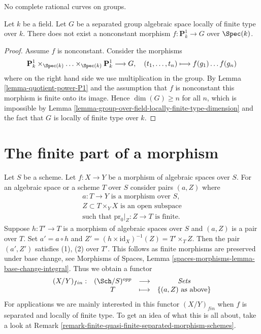\begin{lemma}
\label{lemma-no-nonconstant-morphism-from-P1-to-group}
\begin{slogan}
No complete rational curves on groups.
\end{slogan}
Let $k$ be a field. Let $G$ be a separated group algebraic space locally
of finite type over $k$. There does not exist a nonconstant
morphism $f : \mathbf{P}^1_k \to G$ over $\Spec(k)$.
\end{lemma}

\begin{proof}
Assume $f$ is nonconstant. Consider the morphisms
$$
\mathbf{P}^1_k \times_{\Spec(k)} \ldots \times_{\Spec(k)} \mathbf{P}^1_k
\longrightarrow G,
\quad (t_1, \ldots, t_n) \longmapsto f(g_1) \ldots f(g_n)
$$
where on the right hand side we use multiplication in the group.
By Lemma \ref{lemma-quotient-power-P1} and the assumption that $f$
is nonconstant this morphism is finite onto its image.
Hence $\dim(G) \geq n$ for all $n$, which is impossible by
Lemma \ref{lemma-group-over-field-locally-finite-type-dimension}
and the fact that $G$ is locally of finite type over $k$.
\end{proof}




\section{The finite part of a morphism}
\label{section-finite}

\noindent
Let $S$ be a scheme.
Let $f : X \to Y$ be a morphism of algebraic spaces over $S$.
For an algebraic space or a scheme $T$ over $S$ consider pairs
$(a, Z)$ where
\begin{equation}
\label{equation-finite-conditions}
\begin{matrix}
a : T \to Y\text{ is a morphism over }S, \\
Z \subset T \times_Y X\text{ is an open subspace} \\
\text{such that }\text{pr}_0|_Z : Z \to T\text{ is finite.}
\end{matrix}
\end{equation}
Suppose $h : T' \to T$ is a morphism of algebraic spaces over $S$
and $(a, Z)$ is a pair over $T$. Set
$a' = a \circ h$ and $Z' = (h \times \text{id}_X)^{-1}(Z) = T' \times_T Z$.
Then the pair $(a', Z')$ satisfies (1), (2) over $T'$.
This follows as finite morphisms are preserved under base change, see
Morphisms of Spaces, Lemma \ref{spaces-morphisms-lemma-base-change-integral}.
Thus we obtain a functor
\begin{equation}
\label{equation-finite}
\begin{matrix}
(X/Y)_{fin} : &
(\Sch/S)^{opp} &
\longrightarrow &
\textit{Sets} \\
& T & \longmapsto &
\{(a, Z)\text{ as above}\}
\end{matrix}
\end{equation}
For applications we are mainly interested in this functor $(X/Y)_{fin}$
when $f$ is separated and locally of finite type. To get an idea
of what this is all about, take a look at
Remark \ref{remark-finite-quasi-finite-separated-morphism-schemes}.

